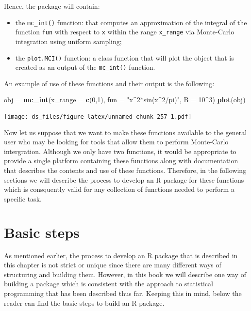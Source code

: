 \documentclass[12pt,]{krantz}
\newenvironment{Shaded}{\begin{snugshade}}{\end{snugshade}}
\newcommand{\KeywordTok}[1]{\textcolor[rgb]{0.27,0.27,0.27}{\textbf{#1}}}
\newcommand{\DataTypeTok}[1]{\textcolor[rgb]{0.27,0.27,0.27}{#1}}
\newcommand{\DecValTok}[1]{\textcolor[rgb]{0.06,0.06,0.06}{#1}}
\newcommand{\StringTok}[1]{\textcolor[rgb]{0.5,0.5,0.5}{#1}}
\newcommand{\OperatorTok}[1]{\textcolor[rgb]{0.43,0.43,0.43}{\textbf{#1}}}
\newcommand{\NormalTok}[1]{#1}
\providecommand{\tightlist}{%
  \setlength{\itemsep}{0pt}\setlength{\parskip}{0pt}}
\begin{document}
Hence, the package will contain:

\begin{itemize}
\tightlist
\item
  the \texttt{mc\_int()} function: that computes an approximation of the
  integral of the function \texttt{fun} with respect to \texttt{x}
  within the range \texttt{x\_range} via Monte-Carlo integration using
  uniform sampling;
\item
  the \texttt{plot.MCI()} function: a class function that will plot the
  object that is created as an output of the \texttt{mc\_int()}
  function.
\end{itemize}

An example of use of these functions and their output is the following:

\begin{Shaded}
\begin{Highlighting}[]
\NormalTok{obj =}\StringTok{ }\KeywordTok{mc_int}\NormalTok{(}\DataTypeTok{x_range =} \KeywordTok{c}\NormalTok{(}\DecValTok{0}\NormalTok{,}\DecValTok{1}\NormalTok{), }\DataTypeTok{fun =} \StringTok{"x^2*sin(x^2/pi)"}\NormalTok{, }\DataTypeTok{B =} \DecValTok{10}\OperatorTok{^}\DecValTok{3}\NormalTok{)}
\KeywordTok{plot}\NormalTok{(obj)}
\end{Highlighting}
\end{Shaded}

\texttt{[image: ds\_files/figure-latex/unnamed-chunk-257-1.pdf]}

Now let us suppose that we want to make these functions available to the
general user who may be looking for tools that allow them to perform
Monte-Carlo intergration. Although we only have two functions, it would
be appropriate to provide a single platform containing these functions
along with documentation that describes the contents and use of these
functions. Therefore, in the following sections we will describe the
process to develop an R package for these functions which is consquently
valid for any collection of functions needed to perform a specific task.

\section{Basic steps}\label{basic-steps}

As mentioned earlier, the process to develop an R package that is
described in this chapter is not strict or unique since there are many
different ways of structuring and building them. However, in this book
we will describe one way of building a package which is consistent with
the approach to statistical programming that has been described thus
far. Keeping this in mind, below the reader can find the basic steps to
build an R package.
\end{document}

